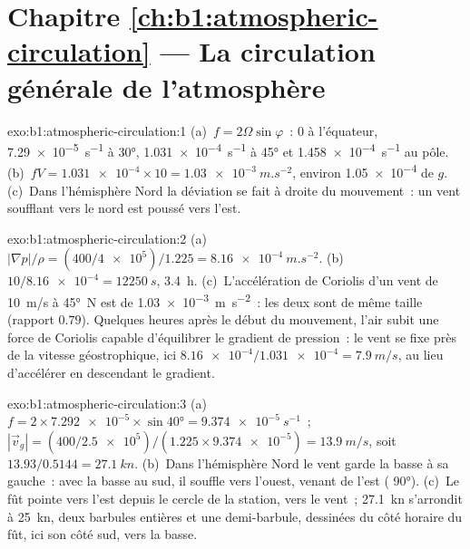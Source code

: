 \section*{Chapitre \ref{ch:b1:atmospheric-circulation} --- La circulation générale de l'atmosphère}

\begin{solution}{exo:b1:atmospheric-circulation:1}
(a)~$f = 2\Omega\sin\varphi$~: $0$ à l'équateur, \qty{7.29e-5}{s^{-1}} à \ang{30},
\qty{1.031e-4}{s^{-1}} à \ang{45} et \qty{1.458e-4}{s^{-1}} au pôle.
(b)~$fV = \num{1.031e-4} \times 10 = \qty{1.03e-3}{m.s^{-2}}$, environ \num{1.05e-4}
de $g$. (c)~Dans l'hémisphère Nord la déviation se fait à droite du mouvement~:
un vent soufflant vers le nord est poussé vers l'est.
\end{solution}

\begin{solution}{exo:b1:atmospheric-circulation:2}
(a)~$|\nabla p|/\rho = (400/\num{4e5})/1.225 = \qty{8.16e-4}{m.s^{-2}}$.
(b)~$10/\num{8.16e-4} = \qty{12250}{s}$, \qty{3.4}{h}. (c)~L'accélération de Coriolis
d'un vent de \qty{10}{m/s} à \ang{45}~N est de \qty{1.03e-3}{m.s^{-2}}~: les deux sont de
même taille (rapport $0.79$). Quelques heures après le début du mouvement, l'air subit une
force de Coriolis capable d'équilibrer le gradient de pression~: le vent se fixe près de la
vitesse géostrophique, ici $\num{8.16e-4}/\num{1.031e-4} = \qty{7.9}{m/s}$, au lieu
d'accélérer en descendant le gradient.
\end{solution}

\begin{solution}{exo:b1:atmospheric-circulation:3}
(a)~$f = 2 \times \num{7.292e-5} \times \sin\ang{40} = \qty{9.374e-5}{s^{-1}}$~;
$|\vec v_g| = (400/\num{2.5e5})/(1.225 \times \num{9.374e-5}) = \qty{13.9}{m/s}$, soit
$13.93/0.5144 = \qty{27.1}{kn}$. (b)~Dans l'hémisphère Nord le vent garde la
basse à sa gauche~: avec la basse au sud, il souffle vers l'ouest, venant de l'est
( \ang{90}). (c)~Le fût pointe vers l'est depuis le cercle de la station, vers le
vent~; \qty{27.1}{kn} s'arrondit à \qty{25}{kn}, deux barbules entières et une demi-barbule,
dessinées du côté horaire du fût, ici son côté sud, vers la basse.
\end{solution}

